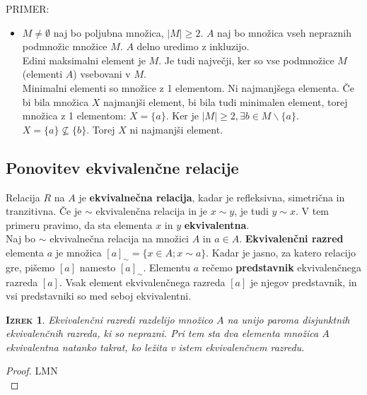\documentclass[a4paper,12pt]{article}
\newtheorem*{izrek}{\textsc{Izrek}}
\begin{document}
\newpage 

PRIMER:
\begin{itemize}
\item $M\neq \emptyset$ naj bo poljubna množica, $|M|\geq 2$. $A$ naj bo množica vseh nepraznih podmnožic množice $M$. $A$ delno uredimo z inkluzijo. \\

Edini maksimalni element je $M$. Je tudi največji, ker so vse podmnožice $M$ (elementi $A$) vsebovani v $M$. \\

Minimalni elementi so množice z 1 elementom. Ni najmanjšega elementa. Če bi bila množica $X$ najmanjši element, bi bila tudi minimalen element, torej množica z 1 elementom: $X=\{a\}$. Ker je $|M|\geq 2,\exists b \in M \backslash \{a\}$. $X=\{a\} \not\subseteq \{b\}$. Torej $X$ ni najmanjši element.\\
\end{itemize} 

\subsection{Ponovitev ekvivalenčne relacije}

Relacija $R$ na $A$ je \textbf{ekvivalnečna relacija}, kadar je refleksivna, simetrična in tranzitivna. Če je $\sim$ ekvivalenčna relacija in je $x\sim y$, je tudi $y\sim x$. V tem primeru pravimo, da sta elementa $x$ in $y$ \textbf{ekvivalentna}. \\

Naj bo $\sim$ ekvivalnečna relacija na množici $A$ in $a\in A$. \textbf{Ekvivalenčni razred} elementa $a$ je množica $[a]_\sim=\{x\in A;x\sim a\}$. Kadar je jasno, za katero relacijo gre, pišemo $[a]$ namesto $[a]_\sim$. Elementu $a$ rečemo \textbf{predstavnik} ekvivalenčnega razreda $[a]$. Vsak element ekvivalenčnega razreda $[a]$ je njegov predstavnik, in vsi predstavniki so med seboj ekvivalentni. \\

\begin{izrek}
Ekvivalenčni razredi razdelijo množico $A$ na unijo paroma disjunktnih ekvivalenčnih razreda, ki so neprazni. Pri tem sta dva elementa množica $A$ ekvivalentna natanko takrat, ko ležita v istem ekvivalenčnem razredu. \\
\end{izrek}

\begin{proof}
LMN \\
\end{proof}
\end{document}
